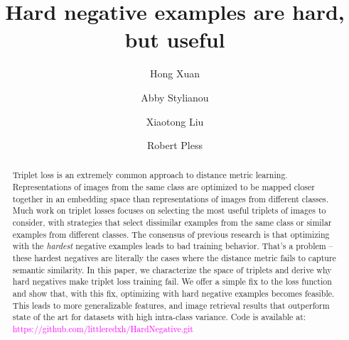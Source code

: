 \documentclass[runningheads]{llncs}
\begin{document}
\pagestyle{headings}
\mainmatter
\def\ECCVSubNumber{2100} 

\title{Hard negative examples are hard, but useful} 

\author{Hong Xuan \and
Abby Stylianou \and
Xiaotong Liu \and
Robert Pless}




\maketitle

\begin{abstract}
Triplet loss is an extremely common approach to distance metric learning.  Representations of images from the same class are optimized to be mapped closer together in an embedding space than representations of images from different classes.  Much work on triplet losses focuses on selecting the most useful triplets of images to consider, with strategies that select dissimilar examples from the same class or similar examples from different classes. The consensus of previous research is that optimizing with the \textit{hardest} negative examples leads to bad training behavior.   That's a problem -- these hardest negatives are literally the cases where the distance metric fails to capture semantic similarity.  In this paper, we characterize the space of triplets and derive why hard negatives make triplet loss training fail.  We offer a simple fix to the loss function and show that, with this fix, optimizing with hard negative examples becomes feasible.  This leads to more generalizable features, and image retrieval results that outperform state of the art for datasets with high intra-class variance. Code is available at:  \textcolor{magenta}{https://github.com/littleredxh/HardNegative.git}
\end{abstract}
\end{document}
